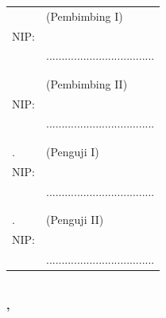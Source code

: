 \noindent
\begin{tabularx}{\textwidth}{X l}
  \advisor{}               & (Pembimbing I)                      \\
  NIP: \advisornip{}       &                                     \\
                           & ................................... \\
                           &                                     \\
                           &                                     \\
  \coadvisor{}             & (Pembimbing II)                     \\
  NIP: \coadvisornip{}     &                                     \\
                           & ................................... \\
                           &                                     \\
                           &                                     \\
  \examinerone{}.          & (Penguji I)                         \\
  NIP: \examineronenip{}   &                                     \\
                           & ................................... \\
                           &                                     \\
                           &                                     \\
  \examinertwo{}.          & (Penguji II)                        \\
  NIP: \examinertwonip{}   &                                     \\
                           & ................................... \\
\end{tabularx}
\endgroup

% 
% 

\begin{center}
  \textbf{\MakeUppercase{\place{}}\\\MONTH{}, \the\year{}}
\end{center}
\endgroup
